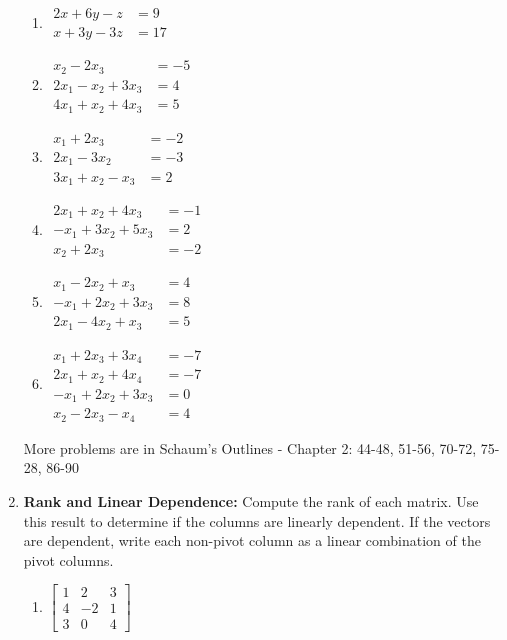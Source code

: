 \begin{enumerate}
\begin{multicols}{3}
\begin{enumerate}
	\item 
$
\begin{array}{rl}
 2x+ 6y -z &= 9 \\
 x+ 3y -3z &= 17
\end{array}
$


	\item 
$
\begin{array}{rl}
  x_2 -2x_3 &= -5 \\
 2x_1 -x_2 + 3x_3 &= 4 \\
 4x_1 +x_2 + 4x_3 &= 5
\end{array}
$


	\item 
$
\begin{array}{rl}
 x_1 + 2x_3 &= -2 \\
 2x_1  -3x_2  &= -3 \\
 3x_1 +x_2 -x_3 &= 2
\end{array}
$


	\item 
$
\begin{array}{rl}
 2x_1 +x_2 + 4x_3 &= -1 \\
 -x_1 + 3x_2 + 5x_3 &= 2 \\
 x_2 + 2x_3 &= -2
\end{array}
$


	\item 
$
\begin{array}{rl}
 x_1 -2x_2 +x_3 &= 4 \\
 -x_1 + 2x_2 + 3x_3 &= 8 \\
 2x_1  -4x_2 +x_3 &= 5
\end{array}
$


	\item 
$
\begin{array}{rl}
 x_1 + 2x_3 + 3x_4 &= -7 \\
 2x_1 +x_2 + 4x_4 &= -7 \\
 -x_1 + 2x_2 + 3x_3  &= 0 \\
 x_2  -2x_3  -x_4 &= 4
\end{array}
$
\end{enumerate}
\end{multicols}

More problems are in Schaum's Outlines - 
Chapter 2:
44-48, 51-56, 70-72, 75-28, 86-90 






\item \textbf{Rank and Linear Dependence:} Compute the rank of each matrix. Use this result to determine if the columns are linearly dependent. If the vectors are dependent, write each non-pivot column as a linear combination of the pivot columns.
\begin{multicols}{4}
\begin{enumerate}
	\item \label{rank1} 
$
\begin{bmatrix}
 1 & 2 & 3 \\
 4 & -2 & 1 \\
 3 & 0 & 4
\end{bmatrix}
$


\end{enumerate}
\end{multicols}
\end{enumerate}
